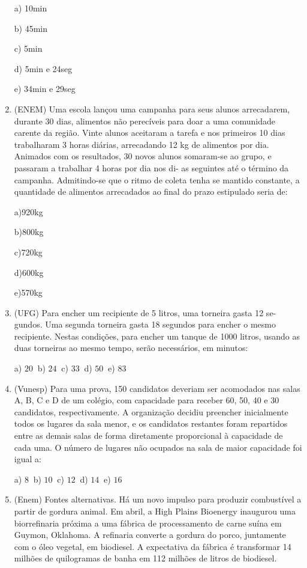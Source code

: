 \begin{multicols*}{2}
\begin{enumerate}
              a) 10min

              b) 45min

              c) 5min

              d) 5min e 24seg

              e) 34min e 29seg

        \item (ENEM) Uma escola lançou uma campanha para seus alunos arrecadarem, durante 30 dias, alimentos não perecíveis para doar a uma comunidade carente da região. Vinte alunos aceitaram a tarefa e nos primeiros 10 dias trabalharam 3 horas diárias, arrecadando 12 kg de alimentos por dia. Animados com os resultados, 30 novos alunos somaram-se ao grupo, e passaram a trabalhar 4 horas por dia nos di- as seguintes até o término da campanha. Admitindo-se que o ritmo de coleta tenha se mantido constante, a quantidade de alimentos arrecadados ao final do prazo estipulado seria de:

              a)920kg

              b)800kg

              c)720kg

              d)600kg

              e)570kg

        \item (UFG) Para encher um recipiente de 5 litros, uma torneira gasta 12 se- gundos. Uma segunda torneira gasta 18 segundos para encher o mesmo recipiente. Nestas condições, para encher um tanque de 1000 litros, usando as duas torneiras ao mesmo tempo, serão necessários, em minutos:

              a) $20 \ $ b) $24 \ $ c) $33 \ $ d) $50 \ $ e) $83 $

        \item (Vunesp) Para uma prova, 150 candidatos deveriam ser acomodados nas salas A, B, C e D de um colégio, com capacidade para receber 60, 50, 40 e 30 candidatos, respectivamente. A organização decidiu preencher inicialmente todos os lugares da sala menor, e os candidatos restantes foram repartidos entre as demais salas de forma diretamente proporcional à capacidade de cada uma. O número de lugares não ocupados na sala de maior capacidade foi igual a:

              a) $8 \ $ b) $10 \ $ c) $12 \ $ d) $14 \ $ e) $16 $

        \item (Enem) Fontes alternativas. Há um novo impulso para produzir combustível a partir de gordura animal. Em abril, a High Plains Bioenergy inaugurou uma biorrefinaria próxima a uma fábrica de processamento de carne suína em Guymon, Oklahoma. A refinaria converte a gordura do porco, juntamente com o óleo vegetal, em biodiesel. A expectativa da fábrica é transformar 14 milhões de quilogramas de banha em 112 milhões de litros de biodiesel.


\end{enumerate}
\end{multicols*}
